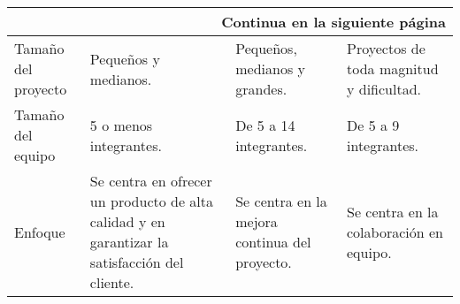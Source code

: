 \begin{longtable}{|p{2.5cm}|p{3cm}|p{3cm}|p{3cm}|}
    \hline \multicolumn{4}{|r|}{{Continua en la siguiente página}}                                                                                                                                                                                                                                                                                                                                                                                                                                                                                                                                        \\ \hline
    \endfoot

    \hline \hline
    \endlastfoot
    Tamaño del proyecto                            & Pequeños y medianos.                                                                                                                                                & Pequeños, medianos y grandes.                                                                                                                                                           & Proyectos de toda magnitud y dificultad.                                                                                                                                             \\ \hline
    Tamaño del equipo                              & 5 o menos integrantes.                                                                                                                                              & De 5 a 14 integrantes.                                                                                                                                                                  & De 5 a 9 integrantes.                                                                                                                                                                \\ \hline
    Enfoque                                        & Se centra en ofrecer un producto de alta calidad y en garantizar la satisfacción del cliente.                                                                       & Se centra en la mejora continua del proyecto.                                                                                                                                           & Se centra en la colaboración en equipo.                                                                                                                                              \\ \hline

\end{longtable}
